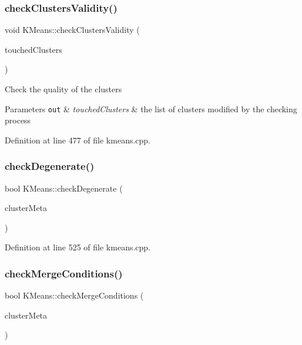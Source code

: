 \subsubsection{\texorpdfstring{check\+Clusters\+Validity()}{checkClustersValidity()}}
{\footnotesize\ttfamily void K\+Means\+::check\+Clusters\+Validity (\begin{DoxyParamCaption}\item[{vector$<$ int $>$ \&}]{touched\+Clusters }\end{DoxyParamCaption})}

Check the quality of the clusters


\begin{DoxyParams}[1]{Parameters}
\mbox{\tt out}  & {\em touched\+Clusters} & the list of clusters modified by the checking process \\
\hline
\end{DoxyParams}


Definition at line 477 of file kmeans.\+cpp.

\mbox{\label{class_k_means_a58eecd073218a14075ade361a7858563}} 
\subsubsection{\texorpdfstring{check\+Degenerate()}{checkDegenerate()}}
{\footnotesize\ttfamily bool K\+Means\+::check\+Degenerate (\begin{DoxyParamCaption}\item[{\hyperlink{class_wss_bag}{Wss\+Bag} \&}]{cluster\+Meta }\end{DoxyParamCaption})}



Definition at line 525 of file kmeans.\+cpp.

\mbox{\label{class_k_means_a6fd3c45341b534c0ee08bb1ef57ed0d6}} 
\subsubsection{\texorpdfstring{check\+Merge\+Conditions()}{checkMergeConditions()}}
{\footnotesize\ttfamily bool K\+Means\+::check\+Merge\+Conditions (\begin{DoxyParamCaption}\item[{\hyperlink{class_wss_bag}{Wss\+Bag} \&}]{cluster\+Meta }\end{DoxyParamCaption})}

